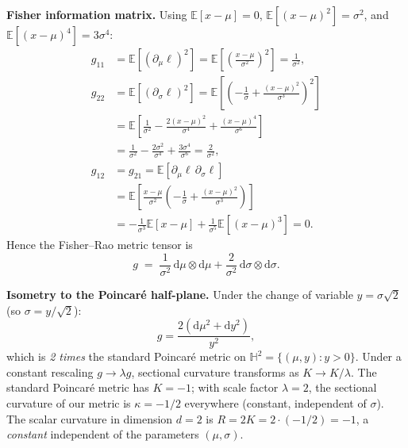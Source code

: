 \documentclass[a4paper,fleqn]{cas-dc}
\newcommand{\E}{\mathbb{E}}
\begin{document}
\textbf{Fisher information matrix.}
Using $\E[x-\mu]=0$, $\E[(x-\mu)^2]=\sigma^2$, and
$\E[(x-\mu)^4]=3\sigma^4$:
\begin{align*}
  g_{11}
  &=
  \E\!\left[(\partial_\mu \ell)^2\right]
  =
  \E\!\left[
    \left(\frac{x-\mu}{\sigma^2}\right)^2
  \right]
  =
  \frac{1}{\sigma^2}, \\[0.4em]
  g_{22}
  &=
  \E\!\left[(\partial_\sigma \ell)^2\right]
  =
  \E\!\left[
    \left(
      -\frac{1}{\sigma}
      +
      \frac{(x-\mu)^2}{\sigma^3}
    \right)^2
  \right] \\
  &=
  \E\!\left[
    \frac{1}{\sigma^2}
    -
    \frac{2(x-\mu)^2}{\sigma^4}
    +
    \frac{(x-\mu)^4}{\sigma^6}
  \right]\\
  &=
  \frac{1}{\sigma^2}
  -
  \frac{2\sigma^2}{\sigma^4}
  +
  \frac{3\sigma^4}{\sigma^6}
  =
  \frac{2}{\sigma^2}, \\[0.4em]
  g_{12}
  &=
  g_{21}
  =
  \E\!\left[
    \partial_\mu \ell\,\partial_\sigma \ell
  \right] \\
  &=
  \E\!\left[
    \frac{x-\mu}{\sigma^2}
    \left(
      -\frac{1}{\sigma}
      +
      \frac{(x-\mu)^2}{\sigma^3}
    \right)
  \right] \\
  &=
  -\frac{1}{\sigma^3}\E[x-\mu]
  +
  \frac{1}{\sigma^5}\E[(x-\mu)^3]
  =
  0.
\end{align*}
Hence the Fisher--Rao metric tensor is
\begin{equation}
  g \;=\; \frac{1}{\sigma^2}\,\mathrm{d}\mu\otimes\mathrm{d}\mu
       + \frac{2}{\sigma^2}\,\mathrm{d}\sigma\otimes\mathrm{d}\sigma.
  \label{eq:gauss_fim_explicit}
\end{equation}

\textbf{Isometry to the Poincar\'e half-plane.}
Under the change of variable $y = \sigma\sqrt{2}$ (so $\sigma = y/\sqrt{2}$):
\[
  g = \frac{2(\mathrm{d}\mu^2 + \mathrm{d}y^2)}{y^2},
\]
which is \emph{2 times} the standard Poincar\'e metric on
$\mathbb{H}^2 = \{(\mu,y):y>0\}$.
Under a constant rescaling $g \to \lambda g$, sectional curvature
transforms as $K \to K/\lambda$.  The standard Poincar\'e metric has
$K=-1$; with scale factor $\lambda=2$, the sectional curvature of our
metric is $\kappa = -1/2$ everywhere (constant, independent of $\sigma$).
The scalar curvature in dimension $d=2$ is $R = 2K = 2\cdot(-1/2) = -1$,
a \emph{constant} independent of the parameters $(\mu, \sigma)$.
\end{document}
